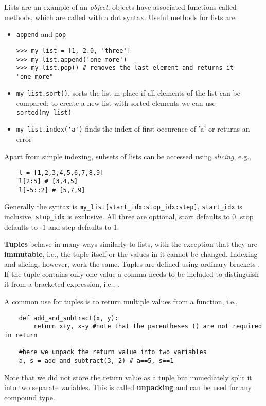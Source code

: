 Lists are an example of an \emph{object}, objects have associated functions called methods, which are called with a dot syntax. Useful methods for lists are
\begin{itemize}
    \item \verb|append| and \verb|pop|
\begin{lstlisting}
>>> my_list = [1, 2.0, 'three']
>>> my_list.append('one more')
>>> my_list.pop() # removes the last element and returns it
"one more"
\end{lstlisting}
    \item \verb|my_list.sort()|, sorts the list in-place if all elements of the list can be compared; to create a new list with sorted elements we can use \verb|sorted(my_list)|
    \item \verb|my_list.index('a')| finds the index of first occurence of 'a' or returns an error
\end{itemize}

Apart from simple indexing, subsets of lists can be accessed using \emph{slicing}, e.g.,
\begin{lstlisting}
    l = [1,2,3,4,5,6,7,8,9]
    l[2:5] # [3,4,5]
    l[-5::2] # [5,7,9]
\end{lstlisting}
Generally the syntax is \verb|my_list[start_idx:stop_idx:step]|, \verb|start_idx| is inclusive, \verb|stop_idx| is exclusive. All three are optional, start defaults to 0, stop defaults to -1 and step defaults to 1.

\textbf{Tuples} behave in many ways similarly to lists, with the exception that they are \textbf{immutable}, i.e., the tuple itself or the values in it cannot be changed. Indexing and slicing, however, work the same. Tuples are defined using ordinary brackets \ls{()}. If the tuple contains only one value a comma needs to be included to distinguish it from a bracketed expression, i.e., .

A common use for tuples is to return multiple values from a function, i.e.,
\begin{lstlisting}
    def add_and_subtract(x, y):
        return x+y, x-y #note that the parentheses () are not required in return

    #here we unpack the return value into two variables
    a, s = add_and_subtract(3, 2) # a==5, s==1
\end{lstlisting}
Note that we did not store the return value as a tuple but immediately split it into two separate variables. This is called \textbf{unpacking} and can be used for any compound type.


